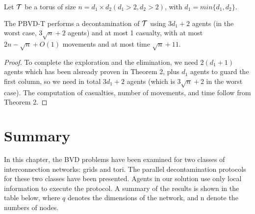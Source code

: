 Let ${\cal T}$ be a   torus of size   $n=d_1\times d_2(d_1>2,d_2>2)$, with $d_1=min\{ d_1,d_2 \}$.

\begin{theorem}
The PBVD-T performs a decontamination of  ${\cal T}$  using $3d_1+2$ agents (in the worst case, 
$3\sqrt n+2$  agents) and at most 1 casualty,  with at most $2n-\sqrt{n}+O(1)$ movements and at most  time $\sqrt{n}+11$.
\end{theorem}
\begin{proof}
To complete the exploration and the elimination, we need $2(d_1+1)$ agents which has been alsready proven in Theorem 2, plus  $d_1$ agents to guard the first column, so we need in total $3d_1+2$ agents (which is $3\sqrt{n}+2$ in the worst case).  The computation of casualties,  number of movements, and   time   follow from Theorem 2.
\end{proof}


\color{blue}
\section{Summary}
In this chapter, the BVD problems have been examined for two classes of interconnection networks: grids and tori. The parallel decontamination protocols for these two classes have been presented. Agents in our solution use only local information to execute the protocol. A summary of the results is shown in the table below, where $q$ denotes the dimensions of the network, and n denote the numbers of nodes.



















